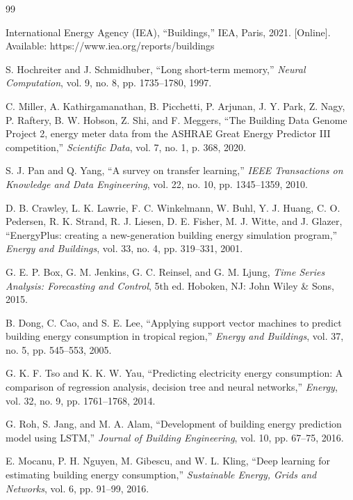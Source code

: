 \documentclass[12pt,a4paper]{report}
\begin{document}

\begin{thebibliography}{99}

International Energy Agency (IEA), ``Buildings,'' IEA, Paris, 2021. [Online]. Available: https://www.iea.org/reports/buildings

S. Hochreiter and J. Schmidhuber, ``Long short-term memory,'' \textit{Neural Computation}, vol. 9, no. 8, pp. 1735--1780, 1997.

C. Miller, A. Kathirgamanathan, B. Picchetti, P. Arjunan, J. Y. Park, Z. Nagy, P. Raftery, B. W. Hobson, Z. Shi, and F. Meggers, ``The Building Data Genome Project 2, energy meter data from the ASHRAE Great Energy Predictor III competition,'' \textit{Scientific Data}, vol. 7, no. 1, p. 368, 2020.

S. J. Pan and Q. Yang, ``A survey on transfer learning,'' \textit{IEEE Transactions on Knowledge and Data Engineering}, vol. 22, no. 10, pp. 1345--1359, 2010.

D. B. Crawley, L. K. Lawrie, F. C. Winkelmann, W. Buhl, Y. J. Huang, C. O. Pedersen, R. K. Strand, R. J. Liesen, D. E. Fisher, M. J. Witte, and J. Glazer, ``EnergyPlus: creating a new-generation building energy simulation program,'' \textit{Energy and Buildings}, vol. 33, no. 4, pp. 319--331, 2001.

G. E. P. Box, G. M. Jenkins, G. C. Reinsel, and G. M. Ljung, \textit{Time Series Analysis: Forecasting and Control}, 5th ed. Hoboken, NJ: John Wiley \& Sons, 2015.

B. Dong, C. Cao, and S. E. Lee, ``Applying support vector machines to predict building energy consumption in tropical region,'' \textit{Energy and Buildings}, vol. 37, no. 5, pp. 545--553, 2005.

G. K. F. Tso and K. K. W. Yau, ``Predicting electricity energy consumption: A comparison of regression analysis, decision tree and neural networks,'' \textit{Energy}, vol. 32, no. 9, pp. 1761--1768, 2014.

G. Roh, S. Jang, and M. A. Alam, ``Development of building energy prediction model using LSTM,'' \textit{Journal of Building Engineering}, vol. 10, pp. 67--75, 2016.

E. Mocanu, P. H. Nguyen, M. Gibescu, and W. L. Kling, ``Deep learning for estimating building energy consumption,'' \textit{Sustainable Energy, Grids and Networks}, vol. 6, pp. 91--99, 2016.


\end{thebibliography}
\end{document}
